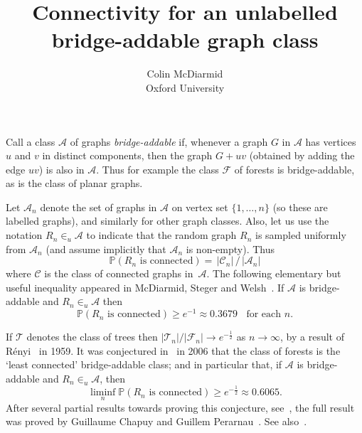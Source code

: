 \documentclass[12pt]{article}
\newcommand{\cA}{\mathcal A}
\newcommand{\cC}{\mathcal C}
\newcommand{\cF}{\mathcal F}
\newcommand{\cT}{\mathcal T}
\newcommand{\pr}{{\mathbb P}}
\begin{document}
\title{Connectivity for an unlabelled bridge-addable graph class}
\author{Colin McDiarmid\\ Oxford University}

\maketitle


Call a class $\cA$ of graphs \emph{bridge-addable} if, whenever a graph $G$ in $\cA$ has vertices $u$ and $v$ in distinct components, then the graph $G+uv$ (obtained by adding the edge $uv$) is also in $\cA$.
Thus for example the class $\cF$ of forests is bridge-addable, as is the class of planar graphs.

Let $\cA_n$ denote the set of graphs in $\cA$ on vertex set $\{1,\ldots,n\}$ (so these are labelled graphs), and similarly for other graph classes.
Also, let us use the notation $R_n \in_u \cA$ to indicate that the random graph $R_n$ is sampled uniformly from $\cA_n$ (and assume implicitly that $\cA_n$ is non-empty).  Thus
\[ \pr(R_n \mbox{ is connected}) = \, |\cC_n|\, / \, |\cA_n|\]
  where $\cC$ is the class of connected graphs in~$\cA$.
 The following elementary but useful inequality appeared in McDiarmid, Steger and Welsh~\cite{msw05,msw06}.
  If $\cA$ is bridge-addable and $R_n \in_u \cA$ then %
\begin{equation} \label{eqn1}
  \pr(R_n \mbox{ is connected}) \geq e^{-1} \approx 0.3679 \;\; \mbox{ for each } n.
\end{equation}

If $\cT$ denotes the class of trees then $|\cT_n|/|\cF_n| \to e^{-\frac12}$ as $n \to \infty$, by a result of R\'enyi~\cite{renyi59} in 1959.
It was conjectured in~\cite{msw06} in 2006 that the class of forests is the `least connected' bridge-addable class; and in particular that,
if $\cA$ is bridge-addable and $R_n \in_u \cA$, then
\begin{equation} \label{conj1}
 \liminf_n   \pr(R_n \mbox{ is connected}) \geq e^{-\frac12}  \approx  0.6065 .
\end{equation}
%
After several partial results towards proving this conjecture, see~\cite{amr2012,bbg2008,bbg2010,kp2013,norin2013},
the full result was proved by Guillaume Chapuy and Guillem Perarnau~\cite{cp2019}.  See also~\cite{cmcd2013,cmcd2016,mw2014,mw2017}.
\medskip
\end{document}
